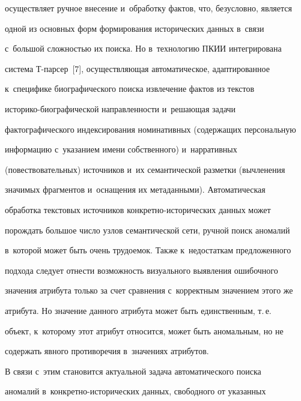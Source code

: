 \begin{enumerate}[1.]
осуществляет ручное внесение и~обработку фактов, что, безусловно, является 


одной из основных форм формирования исторических данных в~связи 


с~большой сложностью их поиска. Но в~технологию ПКИИ интегрирована 


система Т-пар\-сер~[7], осуществляющая автоматическое, адап\-ти\-ро\-ван\-ное 


к~специфике биографического поиска извлечение фактов из текс\-тов  


ис\-то\-ри\-ко-био\-гра\-фи\-че\-ской направленности и~ре\-ша\-ющая задачи 


фактографического индексирования номинативных (содержащих персональную 


информацию с~указанием имени собственного) и~нарративных 


(повествовательных) источников и~их семантической разметки (вычленения 


значимых фрагментов и~оснащения их метаданными). Автоматическая 


обработка текстовых источников кон\-крет\-но-ис\-то\-ри\-че\-ских данных может 


порождать большое чис\-ло узлов семантической сети, ручной поиск аномалий 


в~которой может быть очень трудоемок. Также к~недостаткам предложенного 


подхода следует отнести воз\-мож\-ность визуального выявления ошибочного 


значения атрибута только за счет сравнения с~корректным значением этого же 


атрибута. Но значение данного атрибута может быть единственным, т.\,е.\ 


объект, к~которому этот атрибут относится, может быть аномальным, но не 


содержать явного противоречия в~значениях атрибутов.


{ %





} 





  \end{enumerate}


  


  В связи с~этим становится актуальной задача автоматического поиска 


аномалий в~кон\-крет\-но-ис\-то\-ри\-че\-ских данных, свободного от указанных 


